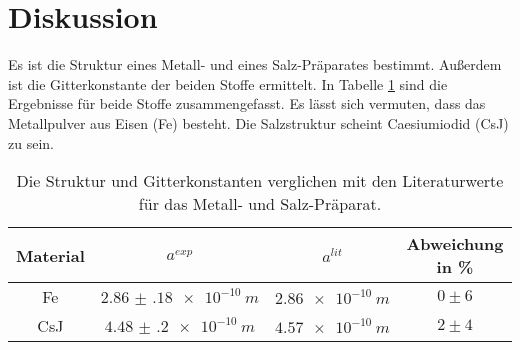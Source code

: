 ﻿\section{Diskussion}
\label{sec:Diskussion}

Es ist die Struktur eines Metall- und eines Salz-Präparates bestimmt. Außerdem ist die Gitterkonstante der beiden Stoffe ermittelt. In Tabelle \ref{tab:disk} sind die Ergebnisse für beide Stoffe zusammengefasst. Es lässt sich vermuten, dass das Metallpulver aus Eisen (Fe) besteht. Die Salzstruktur scheint Caesiumiodid (CsJ) zu sein.
%
\begin{table}[h]
\centering
\caption{Die Struktur und Gitterkonstanten verglichen mit den Literaturwerte für das Metall- und Salz-Präparat.}
\label{tab:disk}
\begin{tabular}{c | c | c | c}
		\hline
		Material & $a^{exp}$ & $a^{lit}$ & Abweichung in \% \\
		\hline
		Fe & $\SI{2.86(18)e-10}{m}$ & $\SI{2.86e-10}{m}$ & $0\pm6$ \\
		CsJ & $\SI{4.48(20)e-10}{m}$ & $\SI{4.57e-10}{m}$ & $2\pm4$ \\
		\hline
\end{tabular}
\end{table}
